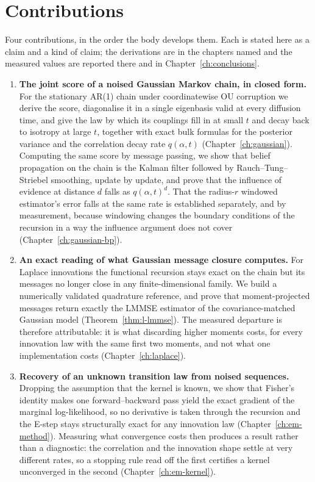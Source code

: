 \section{Contributions}

\noindent Four contributions, in the order the body develops them. Each is
stated here as a claim and a kind of claim; the derivations are in the chapters
named and the measured values are reported there and in
Chapter~\ref{ch:conclusions}.

\begin{enumerate}
  \item \textbf{The joint score of a noised Gaussian Markov chain, in closed
  form.} For the stationary AR(1) chain under coordinatewise OU corruption we
  derive the score, diagonalise it in a single eigenbasis valid at every
  diffusion time, and give the law by which its couplings fill in at small $t$
  and decay back to isotropy at large $t$, together with exact bulk formulas
  for the posterior variance and the correlation decay rate $q(\alpha,t)$
  (Chapter~\ref{ch:gaussian}). Computing the same score by message passing, we
  show that belief propagation on the chain is the Kalman filter followed by
  Rauch--Tung--Striebel smoothing, update by update, and prove that the
  influence of evidence at distance $d$ falls as $q(\alpha,t)^d$. That the
  radius-$r$ windowed estimator's error falls at the same rate is established
  separately, and by measurement, because windowing changes the boundary
  conditions of the recursion in a way the influence argument does not cover
  (Chapter~\ref{ch:gaussian-bp}).

  \item \textbf{An exact reading of what Gaussian message closure computes.}
  For Laplace innovations the functional recursion stays exact on the chain but
  its messages no longer close in any finite-dimensional family. We build a
  numerically validated quadrature reference, and prove that moment-projected
  messages return exactly the LMMSE estimator of the covariance-matched
  Gaussian model (Theorem~\ref{thm:l-lmmse}). The measured departure is
  therefore attributable: it is what discarding higher moments costs, for every
  innovation law with the same first two moments, and not what one
  implementation costs (Chapter~\ref{ch:laplace}).

  \item \textbf{Recovery of an unknown transition law from noised sequences.}
  Dropping the assumption that the kernel is known, we show that Fisher's
  identity makes one forward--backward pass yield the exact gradient of the
  marginal log-likelihood, so no derivative is taken through the recursion and
  the E-step stays structurally exact for any innovation law
  (Chapter~\ref{ch:em-method}). Measuring what convergence costs then produces
  a result rather than a diagnostic: the correlation and the innovation shape
  settle at very different rates, so a stopping rule read off the first
  certifies a kernel unconverged in the second (Chapter~\ref{ch:em-kernel}).


\end{enumerate}
